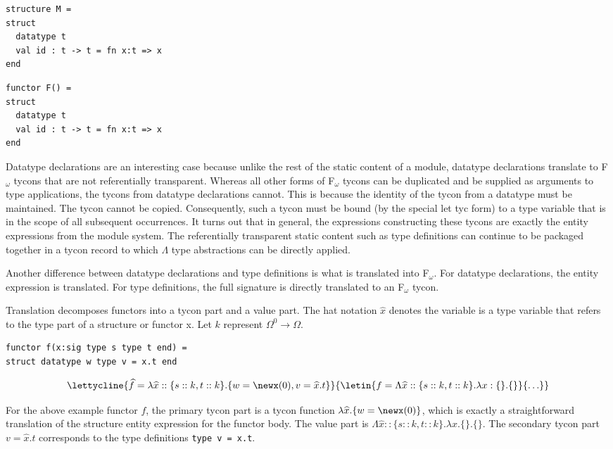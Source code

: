 \documentclass[9pt,nocopyrightspace, fleqn]{sigplanconf}
\begin{document}
\begin{lstlisting}
structure M = 
struct 
  datatype t
  val id : t -> t = fn x:t => x
end
\end{lstlisting}

\begin{lstlisting}
functor F() = 
struct
  datatype t
  val id : t -> t = fn x:t => x
end
\end{lstlisting}

Datatype declarations are an interesting case because unlike the rest
of the static content of a module, datatype declarations translate to
F$_\omega$ tycons that are not referentially transparent. Whereas all
other forms of F$_\omega$ tycons can be duplicated and be supplied as
arguments to type applications, the tycons from datatype declarations
cannot. This is because the identity of the tycon from a datatype must
be maintained. The tycon cannot be copied. Consequently, such a tycon
must be bound (by the special let tyc form) to a type variable that is
in the scope of all subsequent occurrences. It turns out that in
general, the expressions constructing these tycons are exactly the
entity expressions from the module system. The referentially
transparent static content such as type definitions can continue to be
packaged together in a tycon record to which $\Lambda$ type
abstractions can be directly applied.

Another difference between datatype declarations and type definitions
is what is translated into F$_\omega$. For datatype declarations, the
entity expression is translated. For type definitions, the full
signature is directly translated to an F$_\omega$ tycon. 

Translation decomposes functors into a tycon part and a value
part. The hat notation $\widehat{x}$ denotes the variable is a type
variable that refers to the type part of a structure or functor x. Let
$k$ represent $\Omega^0 \to \Omega$. 

\begin{lstlisting}
functor f(x:sig type s type t end) = 
struct datatype w type v = x.t end
\end{lstlisting}
\[\lettycline{\widehat{f}=\lambda \widehat{x}::\{s::k,t::k\}.\{w =
  \newx(0), v=\widehat{x}.t \}}
{\letin{f = \Lambda\widehat{x}::\{s::k, 
t:: k
    \}.\lambda x:\{\}.\{\}}
 {\ldots}}
\]

For the above example functor $f$, the primary tycon part is a tycon
function $\lambda \widehat{x}
. \{w = \newx(0) \}$, which is exactly a straightforward
translation of the structure entity expression for the functor
body. The value part is $\Lambda\widehat{x}::\{s::k, 
t :: k \}.\lambda x.\{\}.\{\}$. The
secondary tycon part $v = \widehat{x}.t$ corresponds to the type definitions
\lstinline{type v = x.t}.
\end{document}
